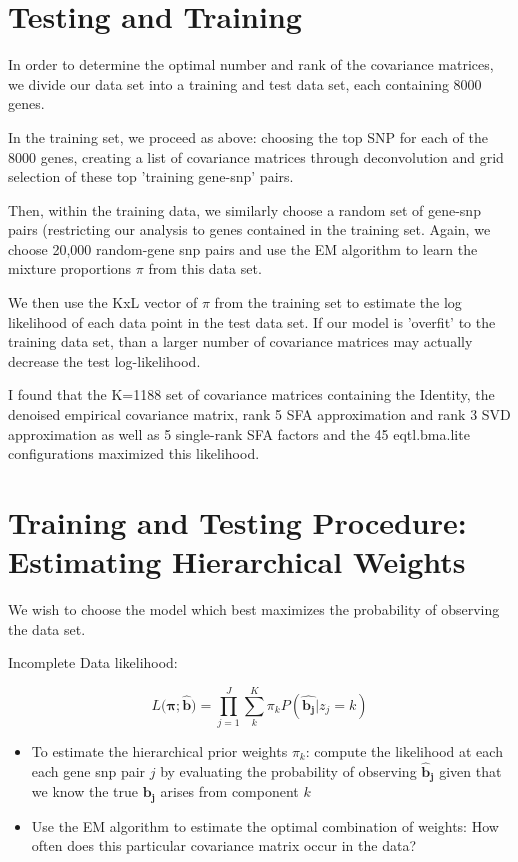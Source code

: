 \documentclass[10pt,letterpaper]{article}
\begin{document}
{\begin{euqation}
\section{Testing and Training}

In order to determine the optimal number and rank of the covariance matrices, we divide our data set into a training and test data set, each containing 8000 genes.

In the training set, we proceed as above: choosing the top SNP for each of the 8000 genes, creating a list of covariance matrices through deconvolution and grid selection of these top 'training gene-snp' pairs. 

Then, within the training data, we similarly choose a random set of gene-snp pairs (restricting our analysis to genes contained in the training set. Again, we choose 20,000 random-gene snp pairs and use the EM algorithm to learn the mixture proportions $\pi$  from this data set.

We then use the KxL vector of $\pi$ from the training set to estimate the log likelihood of each data point in the test data set. If our model is 'overfit' to the training data set, than a larger number of covariance matrices may actually decrease the test log-likelihood. 

I found that the K=1188 set of covariance matrices containing the Identity, the denoised empirical covariance matrix, rank 5 SFA approximation and rank 3 SVD approximation as well as 5 single-rank SFA factors and the 45 eqtl.bma.lite configurations maximized this likelihood.




\section{Training and Testing Procedure: Estimating Hierarchical Weights}

We wish to choose the model which best maximizes the probability of observing the data set. 

Incomplete Data likelihood:

\begin{equation}
L(\bm\pi;{\hat{\bm{b}})} = \prod_{j=1}^J \sum_{k}^{K} \pi_{k} P(\hat{\bm{b_{j}}} | z_{j}=k)
\end{equation}

\begin{itemize}
\item  To estimate the hierarchical prior weights $\pi_{k}$: compute the likelihood at each each gene snp pair $j$ by evaluating the probability of observing $\bm{\hat{b}_{j}}$ given that we know the true $\bm{b_{j}}$ arises from component $k$
\item  Use the EM algorithm to estimate the optimal combination of weights: How often does this particular covariance matrix occur in the data?
\end{itemize}


\end{euqation}}
\end{document}

